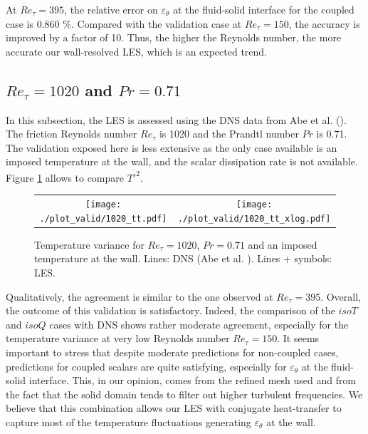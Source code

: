 \documentclass{svjour3}                     %
\begin{document}
At $Re_\tau=395$, the relative error on $\varepsilon_\theta$ at the fluid-solid interface for the coupled case is 0.860 \%.
Compared with the validation case at $Re_\tau = 150$, the accuracy is improved by a factor of 10.
Thus, the higher the Reynolds number, the more accurate our wall-resolved LES, which is an expected trend.

\subsection{$Re_\tau = 1020$ and $Pr = 0.71$}
\label{subsec-dns-1020}

In this subsection, the LES is assessed using the DNS data from Abe et al. (\cite{abe2004surface}).%
The friction Reynolds number $Re_\tau$ is 1020 and the Prandtl number $Pr$ is 0.71.
The validation exposed here is less extensive as the only case available is an imposed temperature at the wall, and the scalar dissipation rate is not available.
Figure \ref{fig-valid_1020_tt} allows to compare $\overline{{T'}^2}$.

\begin{figure}
\centering
\begin{tabular}{cc}
\texttt{[image: ./plot\_valid/1020\_tt.pdf]} &
\texttt{[image: ./plot\_valid/1020\_tt\_xlog.pdf]}
\end{tabular}
\caption{
Temperature variance for $Re_\tau = 1020$, $Pr = 0.71$ and an imposed temperature at the wall.
Lines: DNS (Abe et al. \cite{abe2004surface}).
Lines + symbols: LES.
}\label{fig-valid_1020_tt}
\end{figure}

Qualitatively, the agreement is similar to the one observed at $Re_\tau = 395$.
Overall, the outcome of this validation is satisfactory.
Indeed, the comparison of the $isoT$ and $isoQ$ cases with DNS shows rather moderate agreement, especially for the temperature variance at very low Reynolds number $Re_\tau=150$.
It seems important to stress that despite moderate predictions for non-coupled cases, predictions for coupled scalars are quite satisfying, especially for $\varepsilon_\theta$ at the fluid-solid interface.
This, in our opinion, comes from the refined mesh used and from the fact that the solid domain tends to filter out higher turbulent frequencies.
We believe that this combination allows our LES with conjugate heat-transfer to capture most of the temperature fluctuations generating $\varepsilon_\theta$ at the wall.
\end{document}
